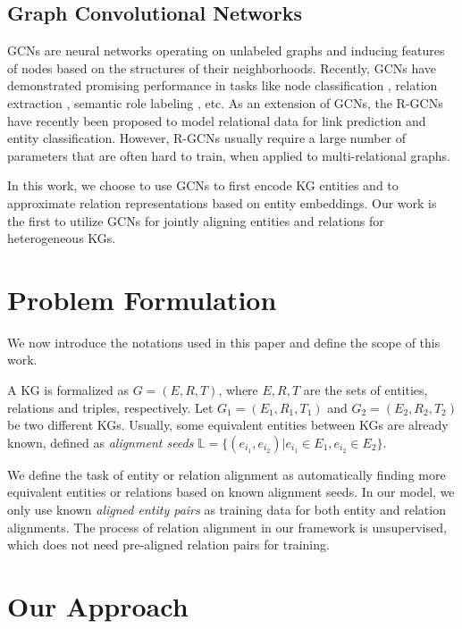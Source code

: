 \documentclass[11pt,a4paper]{article}
\begin{document}
\subsection{Graph Convolutional Networks} 
GCNs \cite{Duvenaud2015Convolutional,Kearnes2016Molecular,Kipf2016Semi} are neural networks operating on unlabeled graphs and inducing
features of nodes based on the structures of their neighborhoods. Recently, GCNs have demonstrated promising performance in tasks like
node classification \cite{Kipf2016Semi}, relation extraction \cite{zhang2018graph}, semantic role labeling \cite{Marcheggiani2017Encoding}, etc. As an extension of GCNs, the R-GCNs \cite{Schlichtkrull2017Modeling} have recently been proposed to model relational data for link
prediction and entity classification. However, R-GCNs
usually require a large number of parameters that are often hard to train, when applied to multi-relational graphs.


In this work, we choose to use GCNs to first encode KG entities and to approximate relation representations based on entity embeddings. Our
work is the first to utilize GCNs for jointly aligning entities and relations for heterogeneous KGs.


\section{Problem Formulation\label{sec:problem}}
We now introduce the notations used in this paper and define the scope of this work.

A KG is formalized as $G = (E, R, T)$, where $E, R, T$ are the sets of entities, relations and triples, respectively. Let $G_1 = (E_1, R_1,
T_1)$ and $G_2 = (E_2, R_2, T_2)$ be two different KGs. Usually, some equivalent entities between KGs are already known,
defined as \emph{alignment seeds} $\mathbb{L} = \{(e_{i_1}, e_{i_2}) | e_{i_1} \in E_1, e_{i_2} \in E_2\}$.

We define the task of entity or relation alignment as automatically finding more equivalent entities or relations based on known alignment
seeds. In our model, we only use known \emph{aligned entity pairs} as training data for both entity and relation alignments. The process of
relation alignment in our framework is unsupervised, which does not need pre-aligned relation pairs for training.


\section{Our Approach}\label{section:app}
\end{document}
